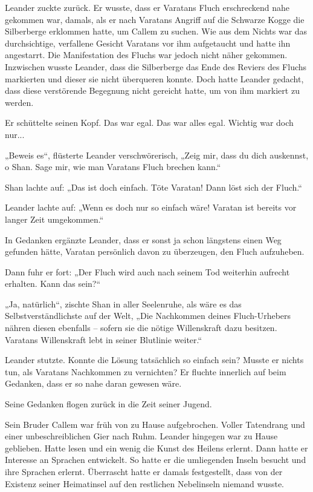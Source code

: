 Leander zuckte zurück. Er wusste, dass er Varatans Fluch erschreckend nahe gekommen war, damals, als er nach Varatans Angriff auf die Schwarze Kogge die Silberberge erklommen hatte, um Callem zu suchen. Wie aus dem Nichts war das durchsichtige, verfallene Gesicht Varatans vor ihm aufgetaucht und hatte ihn angestarrt. Die Manifestation des Fluchs war jedoch nicht näher gekommen. Inzwischen wusste Leander, dass die Silberberge das Ende des Reviers des Fluchs markierten und dieser sie nicht überqueren konnte. Doch hatte Leander gedacht, dass diese verstörende Begegnung nicht gereicht hatte, um von ihm markiert zu werden.

Er schüttelte seinen Kopf. Das war egal. Das war alles egal. Wichtig war doch nur...

„Beweis es“, flüsterte Leander verschwörerisch, „Zeig mir, dass du dich auskennst, o Shan. Sage mir, wie man Varatans Fluch brechen kann.“

Shan lachte auf: „Das ist doch einfach. Töte Varatan! Dann löst sich der Fluch.“

Leander lachte auf: „Wenn es doch nur so einfach wäre! Varatan ist bereits vor langer Zeit umgekommen.“

In Gedanken ergänzte Leander, dass er sonst ja schon längstens einen Weg gefunden hätte, Varatan persönlich davon zu überzeugen, den Fluch aufzuheben.

Dann fuhr er fort: „Der Fluch wird auch nach seinem Tod weiterhin aufrecht erhalten. Kann das sein?“

„Ja, natürlich“, zischte Shan in aller Seelenruhe, als wäre es das Selbstverständlichste auf der Welt, „Die Nachkommen deines Fluch-Urhebers nähren diesen ebenfalls – sofern sie die nötige Willenskraft dazu besitzen. Varatans Willenskraft lebt in seiner Blutlinie weiter.“

Leander stutzte. Konnte die Lösung tatsächlich so einfach sein? Musste er nichts tun, als Varatans Nachkommen zu vernichten? Er fluchte innerlich auf beim Gedanken, dass er so nahe daran gewesen wäre.

Seine Gedanken flogen zurück in die Zeit seiner Jugend.

Sein Bruder Callem war früh von zu Hause aufgebrochen. Voller Tatendrang und einer unbeschreiblichen Gier nach Ruhm. Leander hingegen war zu Hause geblieben. Hatte lesen und ein wenig die Kunst des Heilens erlernt. Dann hatte er Interesse an Sprachen entwickelt. So hatte er die umliegenden Inseln besucht und ihre Sprachen erlernt. Überrascht hatte er damals festgestellt, dass von der Existenz seiner Heimatinsel auf den restlichen Nebelinseln niemand wusste.

